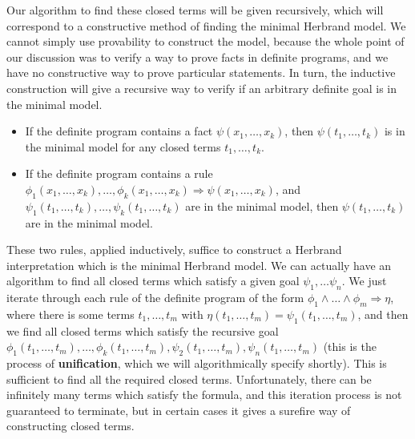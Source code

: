 Our algorithm to find these closed terms will be given recursively, which will correspond to a constructive method of finding the minimal Herbrand model. We cannot simply use provability to construct the model, because the whole point of our discussion was to verify a way to prove facts in definite programs, and we have no constructive way to prove particular statements. In turn, the inductive construction will give a recursive way to verify if an arbitrary definite goal is in the minimal model.
%
\begin{itemize}
    \item If the definite program contains a fact $\psi(x_1, \dots, x_k)$, then $\psi(t_1, \dots, t_k)$ is in the minimal model for any closed terms $t_1, \dots, t_k$.
    \item If the definite program contains a rule $\phi_1(x_1, \dots, x_k), \dots, \phi_k(x_1, \dots, x_k) \Rightarrow \psi(x_1, \dots, x_k)$, and $\psi_1(t_1, \dots, t_k), \dots, \psi_k(t_1, \dots, t_k)$ are in the minimal model, then $\psi(t_1, \dots, t_k)$ are in the minimal model.
\end{itemize}
%
These two rules, applied inductively, suffice to construct a Herbrand interpretation which is the minimal Herbrand model. We can actually have an algorithm to find all closed terms which satisfy a given goal $\psi_1, \dots \psi_n$. We just iterate through each rule of the definite program of the form $\phi_1 \wedge \dots \wedge \phi_m \Rightarrow \eta$, where there is some terms $t_1, \dots, t_m$ with $\eta(t_1, \dots, t_m) = \psi_1(t_1, \dots, t_m)$, and then we find all closed terms which satisfy the recursive goal $\phi_1(t_1, \dots, t_m), \dots, \phi_k(t_1, \dots, t_m), \psi_2(t_1, \dots, t_m), \psi_n(t_1, \dots, t_m)$ (this is the process of {\bf unification}, which we will algorithmically specify shortly). This is sufficient to find all the required closed terms. Unfortunately, there can be infinitely many terms which satisfy the formula, and this iteration process is not guaranteed to terminate, but in certain cases it gives a surefire way of constructing closed terms.

